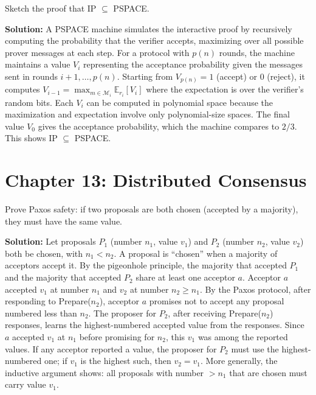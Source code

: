 \begin{exercise}[Challenge]
Sketch the proof that IP $\subseteq$ PSPACE.
\end{exercise}
\textbf{Solution:} A PSPACE machine simulates the interactive proof by recursively computing the probability that the verifier accepts, maximizing over all possible prover messages at each step. For a protocol with $p(n)$ rounds, the machine maintains a value $V_i$ representing the acceptance probability given the messages sent in rounds $i+1, \dots, p(n)$. Starting from $V_{p(n)} = 1$ (accept) or $0$ (reject), it computes $V_{i-1} = \max_{m \in \mathcal{M}_i} \mathbb{E}_{r_i}[V_i]$ where the expectation is over the verifier's random bits. Each $V_i$ can be computed in polynomial space because the maximization and expectation involve only polynomial-size spaces. The final value $V_0$ gives the acceptance probability, which the machine compares to $2/3$. This shows IP $\subseteq$ PSPACE.

\section{Chapter 13: Distributed Consensus}

\begin{exercise}[Basic]
Prove Paxos safety: if two proposals are both chosen (accepted by a majority), they must have the same value.
\end{exercise}
\textbf{Solution:} Let proposals $P_1$ (number $n_1$, value $v_1$) and $P_2$ (number $n_2$, value $v_2$) both be chosen, with $n_1 < n_2$. A proposal is ``chosen'' when a majority of acceptors accept it. By the pigeonhole principle, the majority that accepted $P_1$ and the majority that accepted $P_2$ share at least one acceptor $a$. Acceptor $a$ accepted $v_1$ at number $n_1$ and $v_2$ at number $n_2 \ge n_1$. By the Paxos protocol, after responding to Prepare($n_2$), acceptor $a$ promises not to accept any proposal numbered less than $n_2$. The proposer for $P_2$, after receiving Prepare($n_2$) responses, learns the highest-numbered accepted value from the responses. Since $a$ accepted $v_1$ at $n_1$ before promising for $n_2$, this $v_1$ was among the reported values. If any acceptor reported a value, the proposer for $P_2$ must use the highest-numbered one; if $v_1$ is the highest such, then $v_2 = v_1$. More generally, the inductive argument shows: all proposals with number $> n_1$ that are chosen must carry value $v_1$.

